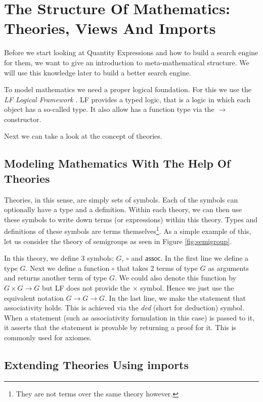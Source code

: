 \section{The Structure Of Mathematics: Theories, Views And Imports}
\label{sec:mathoverview}

Before we start looking at Quantity Expressions and how to build a search engine for them, we want to give an introduction to meta-mathematical structure. We will use this knowledge later to build a better search engine.

To model mathematics we need a proper logical foundation. For this we use the \textit{LF Logical Framework} \cite{hhp93lf}. LF provides a typed logic, that is a logic in which each object has a so-called type. It also allow has a function type via the $\rightarrow$ constructor.

Next we can take a look at the concept of theories.

\subsection{Modeling Mathematics With The Help Of Theories}

Theories, in this sense, are simply sets of symbols. Each of the symbols can optionally have a type and a definition. Within each theory, we can then use these symbols to write down terms (or expressions) within this theory. Types and definitions of these symbols are terms themselves\footnote{They are not terms over the same theory however. }. As a simple example of this, let us consider the theory of semigroups as seen in Figure \ref{fig:semigroup}.



In this theory, we define 3 symbols: $G$, $\circ$ and $\scriptstyle \mathsf{assoc}$. In the first line we define a type $G$. Next we define a function $\circ$ that takes 2 terms of type $G$ as arguments and returns another term of type $G$. We could also denote this function by $G \times G \rightarrow G$ but LF does not provide the $\times$ symbol. Hence we just use the equivalent notation $G \rightarrow G \rightarrow G$. In the last line, we make the statement that associativity holds. This is achieved via the \textit{ded} (short for deduction) symbol. When a statement (such as associativity formulation in this case) is passed to it, it asserts that the statement is provable by returning a proof for it. This is commonly used for axiomes.

\subsection{Extending Theories Using imports}

